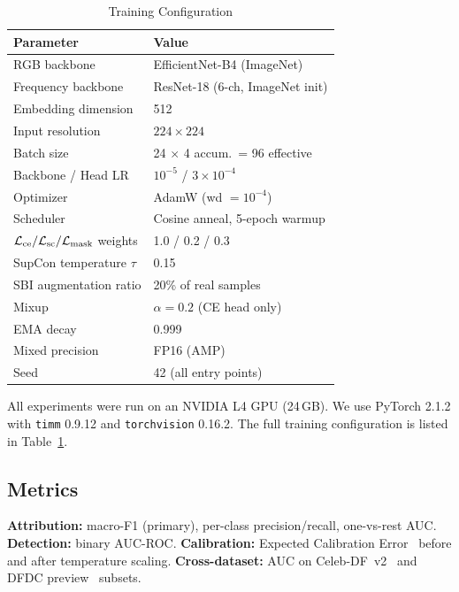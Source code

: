 \begin{table}[t]
\centering
\caption{Training Configuration}
\label{tab:config}
\begin{tabular}{@{}ll@{}}
\toprule
\textbf{Parameter} & \textbf{Value} \\
\midrule
RGB backbone & EfficientNet-B4 (ImageNet) \\
Frequency backbone & ResNet-18 (6-ch, ImageNet init) \\
Embedding dimension & 512 \\
Input resolution & $224 \times 224$ \\
Batch size & 24 $\times$ 4 accum.\ = 96 effective \\
Backbone / Head LR & $10^{-5}$ / $3\!\times\!10^{-4}$ \\
Optimizer & AdamW (wd $= 10^{-4}$) \\
Scheduler & Cosine anneal, 5-epoch warmup \\
$\mathcal{L}_{\text{ce}} / \mathcal{L}_{\text{sc}} / \mathcal{L}_{\text{mask}}$ weights & 1.0 / 0.2 / 0.3 \\
SupCon temperature $\tau$ & 0.15 \\
SBI augmentation ratio & 20\% of real samples \\
Mixup~\cite{zhang2018mixup} & $\alpha\!=\!0.2$ (CE head only) \\
EMA decay & 0.999 \\
Mixed precision & FP16 (AMP) \\
Seed & 42 (all entry points) \\
\bottomrule
\end{tabular}
\end{table}

All experiments were run on an NVIDIA L4 GPU (24\,GB). We use PyTorch 2.1.2 with \texttt{timm} 0.9.12 and \texttt{torchvision} 0.16.2. The full training configuration is listed in Table~\ref{tab:config}.

\subsection{Metrics}
\textbf{Attribution:} macro-F1 (primary), per-class precision/recall, one-vs-rest AUC.  \textbf{Detection:} binary AUC-ROC.  \textbf{Calibration:} Expected Calibration Error~\cite{guo2017calibration} before and after temperature scaling.  \textbf{Cross-dataset:} AUC on Celeb-DF~v2~\cite{li2020celebdf} and DFDC preview~\cite{dolhansky2020dfdc} subsets.
